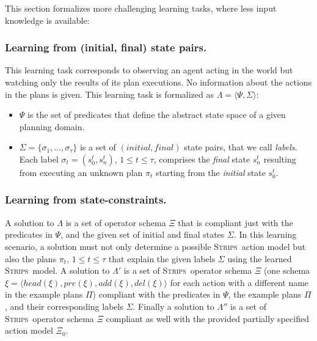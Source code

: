 \documentclass{article}
\newcommand{\tup}[1]{{\langle #1 \rangle}}
\newcommand{\strips}{\textsc{Strips}}     %
\begin{document}
This section formalizes more challenging learning tasks, where less input knowledge is available:

\subsubsection{Learning from (initial, final) state pairs.} This learning task corresponds to observing an agent acting in the world but watching only the results of its plan executions. No information about the actions in the plans is given. This learning task is formalized as $\Lambda=\tup{\Psi,\Sigma}$:
\begin{itemize}
\item $\Psi$ is the set of predicates that define the abstract state space of a given planning domain.
\item $\Sigma=\{\sigma_1,\ldots,\sigma_{\tau}\}$ is a set of $(initial, final)$ state pairs, that we call {\em labels}. Each label $\sigma_t=(s_0^t,s_{n}^t)$, {\tt\small $1\leq t\leq \tau$}, comprises the {\em final} state $s_{n}^t$ resulting from executing an unknown plan $\pi_t$ starting from the {\em initial} state $s_0^t$.
\end{itemize}

\subsubsection{Learning from state-constraints.}

A solution to $\Lambda$ is a set of operator schema $\Xi$ that is compliant just with the predicates in $\Psi$, and the given set of initial and final states $\Sigma$. In this learning scenario, a solution must not only determine a possible \strips\ action model but also the plans $\pi_t$, {\tt\small $1\leq t\leq \tau$} that explain the given labels $\Sigma$ using the learned \strips\ model. A solution to $\Lambda'$ is a set of \strips\ operator schema $\Xi$ (one schema $\xi=\tup{head(\xi),pre(\xi),add(\xi),del(\xi)}$ for each action with a different name in the example plans $\Pi$) compliant with the predicates in $\Psi$, the example plans $\Pi$, and their corresponding labels $\Sigma$.  Finally a solution to $\Lambda''$ is a set of \strips\ operator schema $\Xi$ compliant as well with the provided partially specified action model $\Xi_0$.
\end{document}
